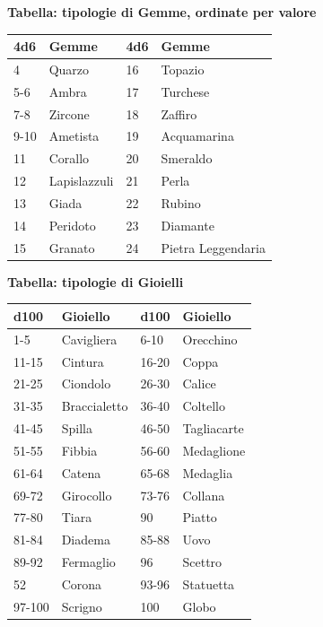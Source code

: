 \begin{multicols}{2}
{\medskip

\textbf{Tabella: tipologie di Gemme, ordinate per valore}

\noindent\begin{tabularx}{\linewidth}{l|l|l|l}
	\toprule
		\textbf{4d6} & \textbf{Gemme} & \textbf{4d6} & \textbf{Gemme} \\
\toprule
		4 & Quarzo & 16 &  Topazio\\
		5-6 & Ambra & 17 & Turchese \\
		7-8 & Zircone & 18 & Zaffiro \\
		9-10 & Ametista & 19 &  Acquamarina\\
		11 & Corallo & 20 & Smeraldo \\
		12 & Lapislazzuli & 21 & Perla \\
		13 & Giada & 22 & Rubino\\
		14 & Peridoto & 23 &  Diamante\\
		15 & Granato & 24 & Pietra Leggendaria\\
\end{tabularx}

\textbf{Tabella: tipologie di Gioielli}

\medskip

{\small \begin{tabularx}{\linewidth}{X|l|X|l}
		\toprule
\textbf{d100} & \textbf{Gioiello} & \textbf{d100} & \textbf{Gioiello}\\
\toprule
1-5 & Cavigliera & 6-10 & Orecchino \\
11-15 & Cintura& 16-20 & Coppa\\
21-25 & Ciondolo& 26-30 & Calice\\
31-35 & Braccialetto& 36-40 & Coltello\\
41-45 & Spilla& 46-50 & Tagliacarte\\
51-55 & Fibbia& 56-60 & Medaglione\\
61-64 & Catena& 65-68 & Medaglia\\
69-72 & Girocollo& 73-76 & Collana\\
77-80 & Tiara& 90& Piatto\\
81-84 & Diadema& 85-88 & Uovo\\
89-92 & Fermaglio& 96 & Scettro\\
52    & Corona& 93-96 & Statuetta\\
97-100 & Scrigno& 100 & Globo
\end{tabularx}}

}
\end{multicols}
